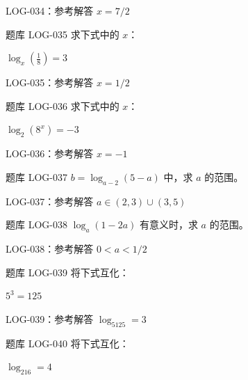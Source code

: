 \documentclass[aspectratio=169,10pt]{beamer}
\begin{document}
\ifdefined\TeacherEdition
\begin{frame}[t]{LOG-034：参考解答}
$x=7/2$
\end{frame}
\fi

\begin{campuspractice}{题库 LOG-035}
求下式中的 $x$：\par
$\log_x(\frac{1}{8})=3$
\end{campuspractice}

\ifdefined\TeacherEdition
\begin{frame}[t]{LOG-035：参考解答}
$x=1/2$
\end{frame}
\fi

\begin{campuspractice}{题库 LOG-036}
求下式中的 $x$：\par
$\log_2(8^x)=-3$
\end{campuspractice}

\ifdefined\TeacherEdition
\begin{frame}[t]{LOG-036：参考解答}
$x=-1$
\end{frame}
\fi

\begin{campuspractice}{题库 LOG-037}
$b=\log_{a-2}(5-a)$ 中，求 $a$ 的范围。
\end{campuspractice}

\ifdefined\TeacherEdition
\begin{frame}[t]{LOG-037：参考解答}
$a\in(2,3)\cup(3,5)$
\end{frame}
\fi

\begin{campuspractice}{题库 LOG-038}
$\log_a(1-2a)$ 有意义时，求 $a$ 的范围。
\end{campuspractice}

\ifdefined\TeacherEdition
\begin{frame}[t]{LOG-038：参考解答}
$0<a<1/2$
\end{frame}
\fi

\begin{campuspractice}{题库 LOG-039}
将下式互化：\par
$5^3=125$
\end{campuspractice}

\ifdefined\TeacherEdition
\begin{frame}[t]{LOG-039：参考解答}
$\log_5125=3$
\end{frame}
\fi

\begin{campuspractice}{题库 LOG-040}
将下式互化：\par
$\log_216=4$
\end{campuspractice}
\end{document}
